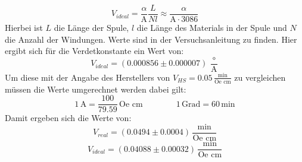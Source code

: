 \begin{equation}
	V_{ideal}=\frac{\alpha}{\text{A}}\frac{L}{Nl}\approx \frac{\alpha}{\text{A}\cdot 3086}
	\label{idealH}
\end{equation}
Hierbei ist $L$ die Länge der Spule, $l$ die Länge des Materials in der Spule und $N$ die Anzahl der Windungen. Werte sind in der Versuchsanleitung zu finden\cite{anleitung}. Hier ergibt sich für die Verdetkonstante ein Wert von:
$$V_{ideal}=(0.000856 \pm 0.000007)\,\frac{\circ}{\text{A}}$$
Um diese mit der Angabe des Herstellers von $V_{HS}=0.05\,\frac{\text{min}}{\text{Oe cm}}$ zu vergleichen müssen die Werte umgerechnet werden dabei gilt:
$$1\,\text{A}=\frac{100}{79.59}\,\text{Oe cm}  \qquad \qquad 1\,\text{Grad}=60\,\text{min}$$
Damit ergeben sich die Werte von:
$$V_{real}=(0.0494 \pm 0.0004)\,\frac{\text{min}}{\text{Oe cm}}$$
$$V_{ideal}=(0.04088 \pm 0.00032)\,\frac{\text{min}}{\text{Oe cm}}$$